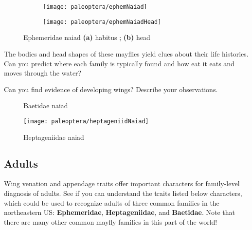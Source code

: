 \begin{figure}[ht!]
    \centering
    \begin{subfigure}[ht!]{0.6\textwidth}
        \texttt{[image: paleoptera/ephemNaiad]}
        \caption{}
        \label{fig:ephemeridlarva}
    \end{subfigure}
    \hfill
    \begin{subfigure}[ht!]{0.25\textwidth}
        \texttt{[image: paleoptera/ephemNaiadHead]}
        \caption{}
        \label{fig:ephemeridlarvahead}
    \end{subfigure}
    \caption{Ephemeridae naiad \textbf{(a)} habitus \citep[modified from][Fig. 59]{bhlpart97188ephem}; \textbf{(b)} head \citep[redrawn from][Fig. 50]{bhlpart97188ephem}}
    \label{fig:ephemeridLarvae}
\end{figure}

\begin{theo}
{}The bodies and head shapes of these mayflies yield clues about their life histories. Can you predict where each family is typically found and how eat it eats and moves through the water?\vspace{3mm}

\noindent{}Can you find evidence of developing wings? Describe your observations.
\end{theo}

\begin{figure}[ht!]
  \centering
  \caption{Baetidae naiad \citep[modified from][Fig. 240]{bhlpart97188ephem}}
  \label{fig:baetidNaiad}
\end{figure}

\begin{figure}[ht!]
  \centering
    \texttt{[image: paleoptera/heptageniidNaiad]}
  \caption{Heptageniidae naiad \citep[modified from][Fig. 360]{bhlpart97188ephem}}
  \label{fig:heptageniidNaiad}
\end{figure}
\FloatBarrier

\subsection{Adults}
\noindent{}Wing venation and appendage traits offer important characters for family-level diagnosis of adults. See if you can understand the traits listed below characters, which could be used to recognize adults of three common families in the northeastern US: \textbf{Ephemeridae}, \textbf{Heptageniidae}, and \textbf{Baetidae}. Note that there are many other common mayfly families in this part of the world!%

